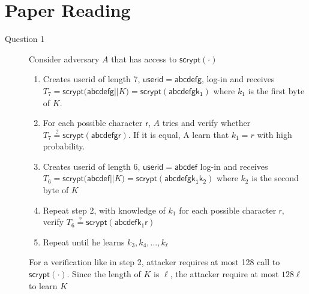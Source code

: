 \documentclass[a4paper,10pt]{article}
\begin{document}
\section{Paper Reading}
\begin{description}
  \item[Question 1]
  Consider adversary $A$ that has access to $\mathsf{scrypt(\cdot)}$
  \begin{enumerate}
    \item Creates userid of length 7, $\mathsf{userid} =\mathsf{abcdefg}$, log-in and receives $T_7= \mathsf{scrypt(abcdefg||}K) = \mathsf{scrypt(abcdefgk_1)}$ where $k_1$ is the first byte of $K$.
    \item For each possible character $\mathsf{r}$, $A$ tries and verify whether $T_7 \stackrel{?}{=} \mathsf{scrypt(abcdefgr)}$. If it is equal, A learn that $k_1=r$ with high probability.  

    \item Creates userid of length 6,  $\mathsf{userid} =\mathsf{abcdef}$ log-in and receives $T_6= \mathsf{scrypt(abcdef||}K) = \mathsf{scrypt(abcdefgk_1k_2)}$ where $k_2$ is the second byte of $K$
    \item Repeat step 2, with knowledge of $k_1$ for each possible character $\mathsf{r}$,  verify  $T_6 \stackrel{?}{=} \mathsf{scrypt(abcdefk_1r)}$

    \item Repeat until he learns $k_3 , k_4, ... ,k_\ell$
  \end{enumerate}
  For a verification like in step 2, attacker requires at most 128 call to $\mathsf{scrypt}(\cdot)$. Since the length of $K$ is $\ell$, the attacker require at most $128\ell$ to learn $K$  
\end{description}
\end{document}
